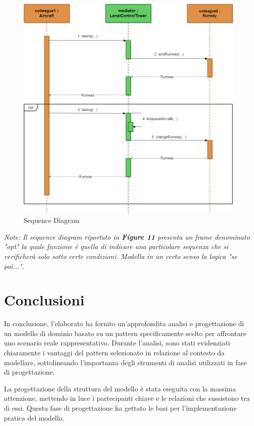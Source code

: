 \documentclass{article}
\begin{document}
\begin{sloppy}
\bigbreak
\begin{figure}[H]
    \centering
    \includegraphics[scale=0.32]{figure11.png}
    \caption{Sequence Diagram}
    \label{fig:enter-label}
\end{figure}
\bigbreak

\textit{Note: Il sequence diagram riportato in \textbf{Figure 11} presenta un frame denominato "opt" la quale funzione è quella di indicare una particolare sequenza che si verificherà solo sotto certe condizioni. Modella in un certo senso la logica "se poi...".}


\section{Conclusioni}
In conclusione, l'elaborato ha fornito un'approfondita analisi e progettazione di un modello di dominio basato su un pattern specificamente scelto per affrontare uno scenario reale rappresentativo. Durante l'analisi, sono stati evidenziati chiaramente i vantaggi del pattern selezionato in relazione al contesto da modellare, sottolineando l'importanza degli strumenti di analisi utilizzati in fase di progettazione.

\bigbreak

La progettazione della struttura del modello è stata eseguita con la massima attenzione, mettendo in luce i partecipanti chiave e le relazioni che sussistono tra di essi. Questa fase di progettazione ha gettato le basi per l'implementazione pratica del modello.


\end{sloppy}
\end{document}
